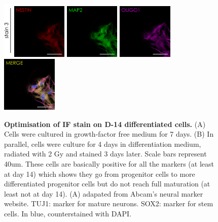 \documentclass[onecolumn,10pt]{asme2ej}
\begin{document}
\begin{figure}[h]
	\includegraphics[width=0.035\textwidth]{figures/IF/charac(light)/stain3}
	\includegraphics[width=0.235\textwidth]{figures/IF/charac(light)/NESTIN(14)OLI}
	\includegraphics[width=0.235\textwidth]{figures/IF/charac(light)/MAP2(14)OLI}
	\includegraphics[width=0.235\textwidth]{figures/IF/charac(light)/OLIGO1(14)OLI}
	\includegraphics[width=0.235\textwidth]{figures/IF/charac(light)/MERGE(14)OLI}
	
	\caption{\textbf{Optimisation of IF stain on D-14 differentiated cells.} (A) Cells were cultured in growth-factor free medium for 7 days. (B) In parallel, cells were culture for 4 days in differentiation medium, radiated with 2 Gy and stained 3 days later. Scale bars represent 40um.	
		These cells are basically positive for all the markers (at least at day 14) which shows they go from progenitor cells to more differentiated progenitor cells but do not reach full maturation (at least not at day 14). 
		(A) adapated from Abcam's neural marker website. 
		TUJ1: marker for mature neurons.
		SOX2: marker for stem cells.
		In blue, counterstained with DAPI.
	}
	\label{stain-opti}
\end{figure}
\newpage
\end{document}
